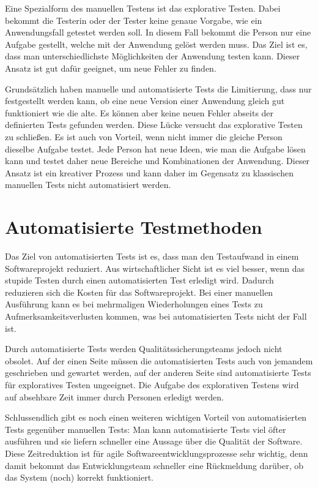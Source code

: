 
\SuperPar
Eine Spezialform des manuellen Testens ist das explorative Testen. Dabei bekommt die Testerin oder der Tester keine genaue Vorgabe, wie ein Anwendungsfall getestet werden soll. In diesem Fall bekommt die Person nur eine Aufgabe gestellt, welche mit der Anwendung gelöst werden muss. Das Ziel ist es, dass man unterschiedlichste Möglichkeiten der Anwendung testen kann. Dieser Ansatz ist gut dafür geeignet, um neue Fehler zu finden. 

\SuperPar
Grundsätzlich haben manuelle und automatisierte Tests die Limitierung, dass nur festgestellt werden kann, ob eine neue Version einer Anwendung gleich gut funktioniert wie die alte. Es können aber keine neuen Fehler abseits der definierten Tests gefunden werden. Diese Lücke versucht das explorative Testen zu schließen. Es ist auch von Vorteil, wenn nicht immer die gleiche Person dieselbe Aufgabe testet. Jede Person hat neue Ideen, wie man die Aufgabe lösen kann und testet daher neue Bereiche und Kombinationen der Anwendung. Dieser Ansatz ist ein kreativer Prozess und kann daher im Gegensatz zu klassischen manuellen Tests nicht automatisiert werden.

\section{Automatisierte Testmethoden}

Das Ziel von automatisierten Tests ist es, dass man den Testaufwand in einem Softwareprojekt reduziert. Aus wirtschaftlicher Sicht ist es viel besser, wenn das stupide Testen durch einen automatisierten Test erledigt wird. Dadurch reduzieren sich die Kosten für das Softwareprojekt. Bei einer manuellen Ausführung kann es bei mehrmaligen Wiederholungen eines Tests zu Aufmerksamkeitsverlusten kommen, was bei automatisierten Tests nicht der Fall ist.

\SuperPar
Durch automatisierte Tests werden Qualitätssicherungsteams jedoch nicht obsolet. Auf der einen Seite müssen die automatisierten Tests auch von jemandem geschrieben und gewartet werden, auf der anderen Seite sind automatisierte Tests für exploratives Testen ungeeignet. Die Aufgabe des explorativen Testens wird auf absehbare Zeit immer durch Personen erledigt werden.

\SuperPar
Schlussendlich gibt es noch einen weiteren wichtigen Vorteil von automatisierten Tests gegenüber manuellen Tests: Man kann automatisierte Tests viel öfter ausführen und sie liefern schneller eine Aussage über die Qualität der Software. Diese Zeitreduktion ist für agile Softwareentwicklungsprozesse sehr wichtig, denn damit bekommt das Entwicklungsteam schneller eine Rückmeldung darüber, ob das System (noch) korrekt funktioniert. 



